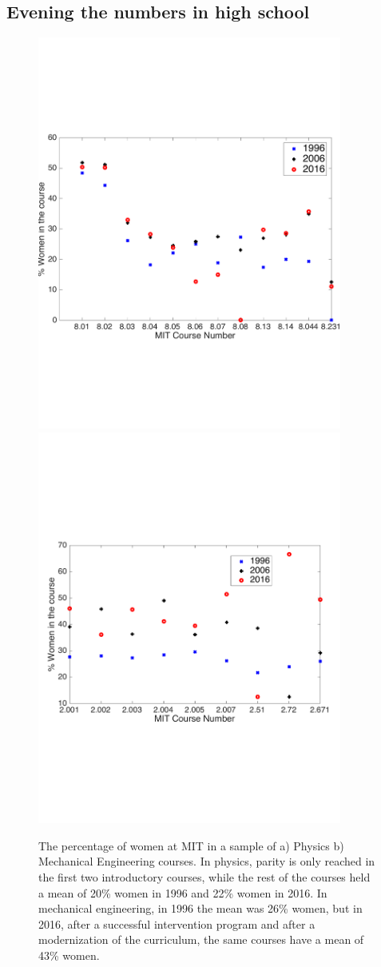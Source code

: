 \documentclass[utf8]{frontiersSCNS} %
\begin{document}
\subsection{Evening the numbers in high school}
\label{6.1}
\begin{figure}%
  \centering
  \includegraphics[width=10cm]{WomenMITPhysics.pdf}
  \includegraphics[width=10cm]{MECoursesMIT.pdf}
  \caption{The percentage of women at MIT in a sample of a) Physics b) Mechanical Engineering courses. In physics, parity is only reached in the first two introductory courses, while the rest of the courses held a mean of 20\% women in 1996 and 22\% women in 2016. In mechanical engineering, in 1996 the mean was 26\% women, but in 2016, after a successful intervention program and after a modernization of the curriculum, the same courses have a mean of 43\% women.}
\label{fig:MITWomen}
\end{figure}
\end{document}
